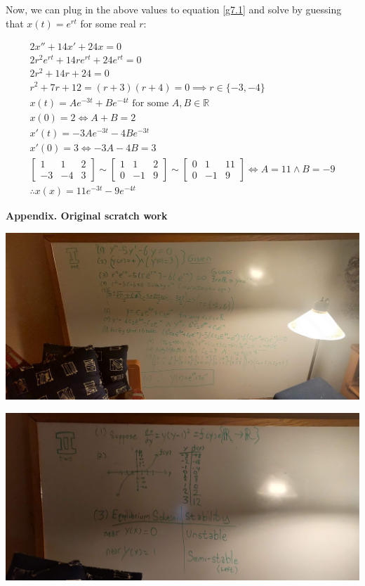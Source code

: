 \documentclass[12pt]{article}
\newcommand{\reals}{\mathbb{R}}
\begin{document}
Now, we can plug in the above values to equation \ref{g7.1} and solve
by guessing that $x(t) = e^{rt}$ for some real $r$:

\begin{align}
	2x'' + 14x' + 24x = 0 \\
	2r^2e^{rt} + 14re^{rt} + 24e^{rt} = 0 \\
	2r^2+ 14r+ 24 = 0 \\
	r^2+ 7r+ 12 = (r+3)(r+4) = 0 \implies r \in \{ -3, -4 \} \\
	x(t) = Ae^{-3t}+Be^{-4t} \textrm{ for some } A,B \in \reals \\
	x(0) = 2 \iff A+B = 2 \\
	x'(t) = -3Ae^{-3t}-4Be^{-3t} \\
	x'(0) = 3 \iff -3A-4B = 3 \\
	\begin{bmatrix} 1 & 1 & 2 \\ -3 & -4 & 3 \end{bmatrix} \sim
	\begin{bmatrix} 1 & 1 & 2 \\ 0 & -1 & 9 \end{bmatrix} \sim
	\begin{bmatrix} 0 & 1 & 11 \\ 0 & -1 & 9 \end{bmatrix} \iff
	A = 11 \land B = -9 \\
	\therefore x(x) = 11e^{-3t}-9e^{-4t}
\end{align}


\medskip

\textbf{Appendix. Original scratch work}

\medskip

\includegraphics[scale=0.075]{1.jpg}

\includegraphics[scale=0.075]{2.jpg}
\end{document}
